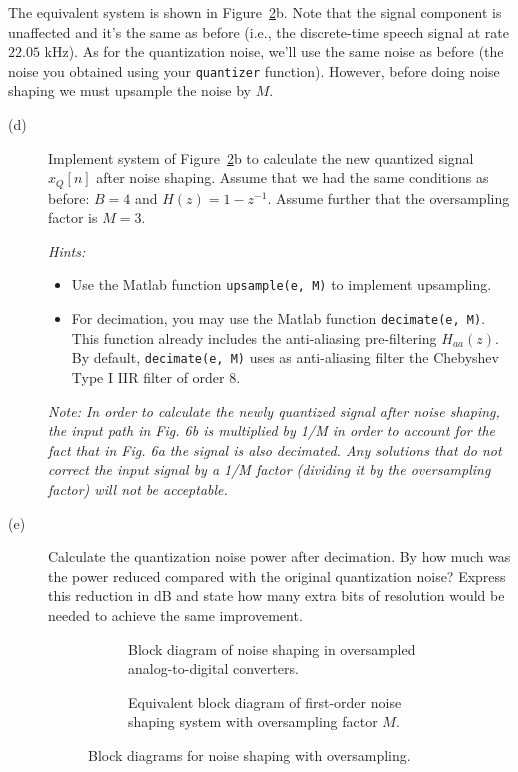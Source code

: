 \documentclass[12pt]{report}
\begin{document}
The equivalent system is shown in Figure~\ref{fig:noise_shaping_diagram2}b. Note that the signal component is unaffected and it's the same as before (i.e., the discrete-time speech signal at rate $22.05$ kHz). As for the quantization noise, we'll use the same noise as before (the noise you obtained using your \texttt{quantizer} function). However, before doing noise shaping we must upsample the noise by $M$.

\begin{description}	
	\item[(d)] Implement system of Figure~\ref{fig:noise_shaping_diagram2}b to calculate the new quantized signal $x_Q[n]$ after noise shaping. Assume that we had the same conditions as before: $B = 4$ and $H(z) = 1 - z^{-1}$. Assume further that the oversampling factor is $M = 3$. 
	
	\textit{Hints:}
	\begin{itemize}
		\item Use the Matlab function \texttt{upsample(e, M)} to implement upsampling.
		\item For decimation, you may use the Matlab function \texttt{decimate(e, M)}. This function already includes the anti-aliasing pre-filtering $H_{aa}(z)$. By default, \texttt{decimate(e, M)} uses as anti-aliasing filter the Chebyshev Type I IIR filter of order 8.
	\end{itemize}
	\textit{Note: In order to calculate the newly quantized signal after noise shaping, the input path in Fig. 6b is multiplied by 1/M in order to account for the fact that in Fig. 6a the signal is also decimated. Any solutions that do not correct the input signal by a 1/M factor (dividing it by the oversampling factor) will not be acceptable.}

	
	\item [(e)] Calculate the quantization noise power after decimation. By how much was the power reduced compared with the original quantization noise? Express this reduction in dB and state how many extra bits of resolution would be needed to achieve the same improvement.
		
\begin{figure}[t]
	\centering
	\begin{subfigure}{\textwidth}
		\centering
		\def\UPSAMPLE{1}
		\resizebox{0.9\textwidth}{!}{}
		\caption{Block diagram of noise shaping in oversampled analog-to-digital converters.} 
	\end{subfigure}
	
	\begin{subfigure}{\textwidth}
		\centering
		\resizebox{0.7\textwidth}{!}{}
		\caption{Equivalent block diagram of first-order noise shaping system with oversampling factor $M$.} \label{fig:noise_shaping_diagram2}
	\end{subfigure}%
	\caption{Block diagrams for noise shaping with oversampling. } \label{fig:noise_shaping_diagram2}
\end{figure}	

\end{description}
\end{document}
